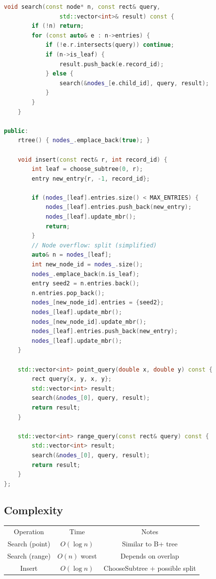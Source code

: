 \begin{lstlisting}[language=C++]
    void search(const node* n, const rect& query,
                std::vector<int>& result) const {
        if (!n) return;
        for (const auto& e : n->entries) {
            if (!e.r.intersects(query)) continue;
            if (n->is_leaf) {
                result.push_back(e.record_id);
            } else {
                search(&nodes_[e.child_id], query, result);
            }
        }
    }

public:
    rtree() { nodes_.emplace_back(true); }

    void insert(const rect& r, int record_id) {
        int leaf = choose_subtree(0, r);
        entry new_entry{r, -1, record_id};

        if (nodes_[leaf].entries.size() < MAX_ENTRIES) {
            nodes_[leaf].entries.push_back(new_entry);
            nodes_[leaf].update_mbr();
            return;
        }
        // Node overflow: split (simplified)
        auto& n = nodes_[leaf];
        int new_node_id = nodes_.size();
        nodes_.emplace_back(n.is_leaf);
        entry seed2 = n.entries.back();
        n.entries.pop_back();
        nodes_[new_node_id].entries = {seed2};
        nodes_[leaf].update_mbr();
        nodes_[new_node_id].update_mbr();
        nodes_[leaf].entries.push_back(new_entry);
        nodes_[leaf].update_mbr();
    }

    std::vector<int> point_query(double x, double y) const {
        rect query{x, y, x, y};
        std::vector<int> result;
        search(&nodes_[0], query, result);
        return result;
    }

    std::vector<int> range_query(const rect& query) const {
        std::vector<int> result;
        search(&nodes_[0], query, result);
        return result;
    }
};
\end{lstlisting}

\subsection{Complexity}

\begin{center}
\begin{tabular}{ccc}
\toprule
Operation & Time & Notes \\
Search (point) & $O(\log n)$ & Similar to B+ tree \\
Search (range) & $O(n)$ worst & Depends on overlap \\
Insert & $O(\log n)$ & ChooseSubtree + possible split \\
\bottomrule
\end{tabular}
\end{center}

